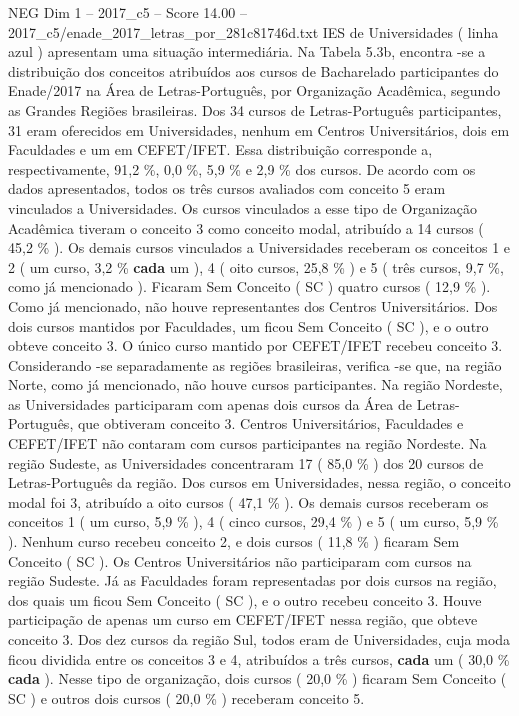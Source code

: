 \begin{textsample}{NEG Dim 1 – 2017\_c5 – Score 14.00 – 2017\_c5/enade\_2017\_letras\_por\_281c81746d.txt}
IES de Universidades ( linha azul ) apresentam uma situação intermediária.
Na Tabela 5.3b, encontra -se a distribuição dos conceitos atribuídos aos cursos de Bacharelado participantes do Enade/2017 na Área de Letras-Português, por Organização Acadêmica, segundo as Grandes Regiões brasileiras.
Dos 34 cursos de Letras-Português participantes, 31 eram oferecidos em Universidades, nenhum em Centros Universitários, dois em Faculdades e um em CEFET/IFET.
Essa distribuição corresponde a, respectivamente, 91,2 \%, 0,0 \%, 5,9 \% e 2,9 \% dos cursos.
De acordo com os dados apresentados, todos os três cursos avaliados com conceito 5 eram vinculados a Universidades.
Os cursos vinculados a esse tipo de Organização Acadêmica tiveram o conceito 3 como conceito modal, atribuído a 14 cursos ( 45,2 \% ).
Os demais cursos vinculados a Universidades receberam os conceitos 1 e 2 ( um curso, 3,2 \% \textbf{cada} um ), 4 ( oito cursos, 25,8 \% ) e 5 ( três cursos, 9,7 \%, como já mencionado ).
Ficaram Sem Conceito ( SC ) quatro cursos ( 12,9 \% ).
Como já mencionado, não houve representantes dos Centros Universitários.
Dos dois cursos mantidos por Faculdades, um ficou Sem Conceito ( SC ), e o outro obteve conceito 3.
O único curso mantido por CEFET/IFET recebeu conceito 3.
Considerando -se separadamente as regiões brasileiras, verifica -se que, na região Norte, como já mencionado, não houve cursos participantes.
Na região Nordeste, as Universidades participaram com apenas dois cursos da Área de Letras-Português, que obtiveram conceito 3.
Centros Universitários, Faculdades e CEFET/IFET não contaram com cursos participantes na região Nordeste.
Na região Sudeste, as Universidades concentraram 17 ( 85,0 \% ) dos 20 cursos de Letras-Português da região.
Dos cursos em Universidades, nessa região, o conceito modal foi 3, atribuído a oito cursos ( 47,1 \% ).
Os demais cursos receberam os conceitos 1 ( um curso, 5,9 \% ), 4 ( cinco cursos, 29,4 \% ) e 5 ( um curso, 5,9 \% ).
Nenhum curso recebeu conceito 2, e dois cursos ( 11,8 \% ) ficaram Sem Conceito ( SC ).
Os Centros Universitários não participaram com cursos na região Sudeste.
Já as Faculdades foram representadas por dois cursos na região, dos quais um ficou Sem Conceito ( SC ), e o outro recebeu conceito 3.
Houve participação de apenas um curso em CEFET/IFET nessa região, que obteve conceito 3.
Dos dez cursos da região Sul, todos eram de Universidades, cuja moda ficou dividida entre os conceitos 3 e 4, atribuídos a três cursos, \textbf{cada} um ( 30,0 \% \textbf{cada} ).
Nesse tipo de organização, dois cursos ( 20,0 \% ) ficaram Sem Conceito ( SC ) e outros dois cursos ( 20,0 \% ) receberam conceito 5.

\end{textsample}
